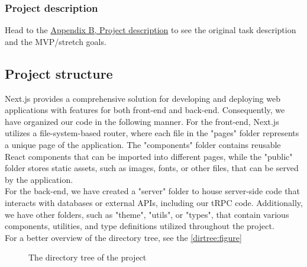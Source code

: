 \subsubsection{Project description}

Head to the \hyperref[chap:project-description]{Appendix B, Project description} to see the original task description and the MVP/stretch goals.

\newpage

\subsection{Project structure}


Next.js provides a comprehensive solution for developing and deploying web applications with features for both front-end and back-end. Consequently, we have organized our code in the following manner. For the front-end, Next.js utilizes a file-system-based router, where each file in the "pages" folder represents a unique page of the application. The "components" folder contains reusable React components that can be imported into different pages, while the "public" folder stores static assets, such as images, fonts, or other files, that can be served by the application. \\

\noindent
For the back-end, we have created a "server" folder to house server-side code that interacts with databases or external APIs, including our tRPC code. Additionally, we have other folders, such as "theme", "utils", or "types", that contain various components, utilities, and type definitions utilized throughout the project. \\

\noindent
For a better overview of the directory tree, see the 
\autoref{dirtree:figure}

\newpage
\vspace*{2cm}

\begin{figure}
    \caption{The directory tree of the project}
    \label{dirtree:figure}
\end{figure}

